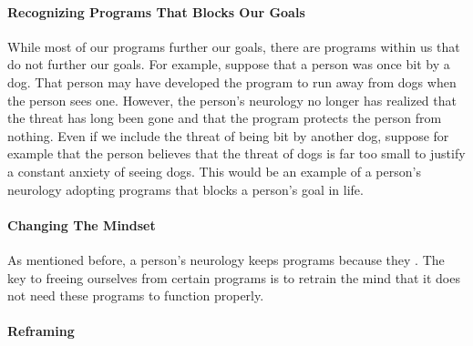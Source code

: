 \documentclass[a4paper, 12pt]{article}
\begin{document}
\paragraph{Recognizing Programs That Blocks Our Goals}
While most of our programs further our goals, there are programs within us that do not further our goals. For example, suppose that a person was once bit by a dog. That person may have developed the program to run away from dogs when the person sees one. However, the person's neurology no longer has realized that the threat has long been gone and that the program protects the person from nothing. Even if we include the threat of being bit by another dog, suppose for example that the person believes that the threat of dogs is far too small to justify a constant anxiety of seeing dogs. This would be an example of a person's neurology adopting programs that blocks a person's goal in life. \\
\paragraph{Changing The Mindset}
As mentioned before, a person's neurology keeps programs because they . The key to freeing ourselves from certain programs is to retrain the mind that it does not need these programs to function properly.
\paragraph{Reframing}
\end{document}
